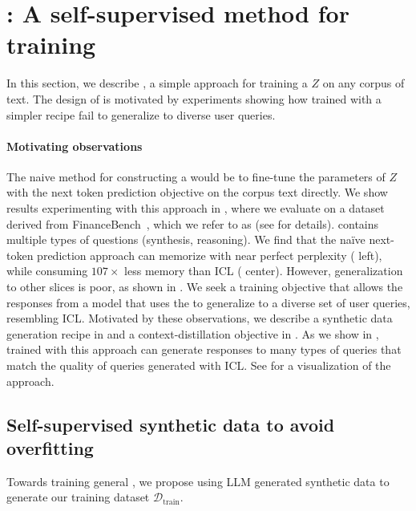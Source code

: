 
\vspace{-2mm}
\ifx\conference\neuripsconf

\fi
\section{\method: A self-supervised method for training \artifacts}
\label{sec:method}
In this section, we describe \method, a simple approach for training a \artifact $Z$ on any corpus of text.
The design of \method is motivated by experiments showing how \artifacts trained with a simpler recipe fail to generalize to diverse user queries.
\ifx\conference\arxivconf

\fi
\vspace{-2mm}
\paragraph{Motivating observations}
The naive method for constructing a \artifact would be to fine-tune the parameters of $Z$ with the next token prediction objective on the corpus text directly. We show results experimenting with this approach in , where we evaluate on a dataset derived from FinanceBench~\cite{islam2023financebench}, which we refer to as \genconvo (see  for details). \genconvo contains multiple types of questions (\eg synthesis, reasoning).
We find that the naïve next-token prediction approach can memorize with near perfect perplexity ( left), while consuming $107\times$ less memory than ICL ( center).
However, generalization to other slices is poor, as shown in . We seek a training objective that allows the responses from a model that uses the \artifact to generalize to a diverse set of user queries, resembling ICL.
Motivated by these observations, we describe a synthetic data generation recipe in  and a context-distillation objective in . As we show in , \artifacts trained with this approach can generate responses to many types of queries that match the quality of queries generated with ICL.
See  for a visualization of the \artifact approach.
\ifx\conference\icmlconf

\fi
\vspace{-2mm}
\subsection{Self-supervised synthetic data to avoid overfitting}
\label{sec:method-data}
Towards training general \artifacts, we propose using LLM generated synthetic data to generate our training dataset $\mathcal{D}_{\text{train}}$.
\vspace{-2mm}
